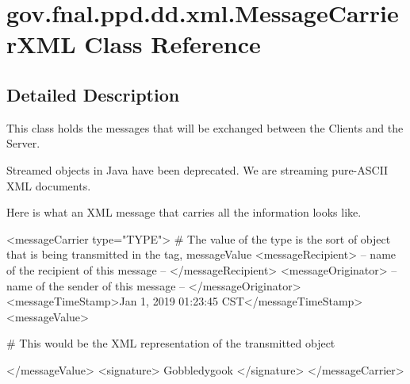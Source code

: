 \hypertarget{classgov_1_1fnal_1_1ppd_1_1dd_1_1xml_1_1MessageCarrierXML}{\section{gov.\-fnal.\-ppd.\-dd.\-xml.\-Message\-Carrier\-X\-M\-L Class Reference}
\label{classgov_1_1fnal_1_1ppd_1_1dd_1_1xml_1_1MessageCarrierXML}
}


\subsection{Detailed Description}
This class holds the messages that will be exchanged between the Clients and the Server.

Streamed objects in Java have been deprecated. We are streaming pure-\/\-A\-S\-C\-I\-I X\-M\-L documents.

Here is what an X\-M\-L message that carries all the information looks like.


\begin{DoxyPre}\end{DoxyPre}



\begin{DoxyPre}<messageCarrier type="TYPE"> \# The value of the type is the sort of object that is being transmitted in the tag, messageValue
  <messageRecipient> -- name of the recipient of this message -- </messageRecipient> 
  <messageOriginator> -- name of the sender of this message -- </messageOriginator> 
    <messageTimeStamp>Jan  1, 2019 01:23:45 CST</messageTimeStamp>
  <messageValue>\end{DoxyPre}



\begin{DoxyPre}  \# This would be the XML representation of the transmitted object\end{DoxyPre}



\begin{DoxyPre}  </messageValue> 
  <signature> 
     Gobbledygook  
  </signature>
</messageCarrier>\end{DoxyPre}



\begin{DoxyPre} \end{DoxyPre}


